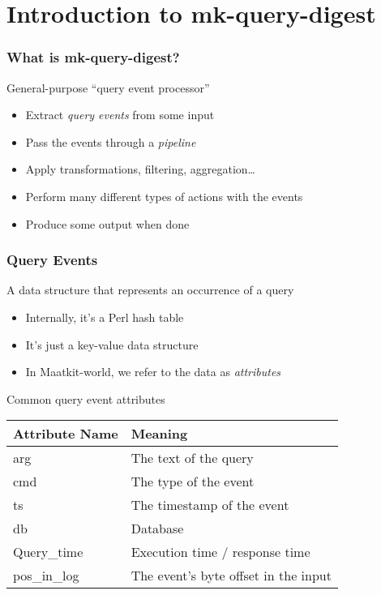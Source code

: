\section{Introduction to mk-query-digest}

\begin{frame}
   \frametitle{What is mk-query-digest?}
   \begin{block}{General-purpose ``query event processor''}
      \begin{itemize}
         \item Extract \emph{query events} from some input
         \item Pass the events through a \emph{pipeline}
         \item Apply transformations, filtering, aggregation\dots
         \item Perform many different types of actions with the events
         \item Produce some output when done
      \end{itemize}
   \end{block}
\end{frame}

\begin{frame}
   \frametitle{Query Events}
   \begin{block}{A data structure that represents an occurrence of a query}
      \begin{itemize}
         \item Internally, it's a Perl hash table
         \item It's just a key-value data structure
         \item In Maatkit-world, we refer to the data as \emph{attributes}
      \end{itemize}
   \end{block}
   \pause
   \begin{block}{Common query event attributes}
      \begin{center}
      \begin{tabular}{ll}
         Attribute Name & Meaning \\
         \hline
         arg         & The text of the query \\
         cmd         & The type of the event \\
         ts          & The timestamp of the event \\
         db          & Database \\
         Query\_time & Execution time / response time \\
         pos\_in\_log & The event's byte offset in the input \\
      \end{tabular}
      \end{center}
   \end{block}
\end{frame}

